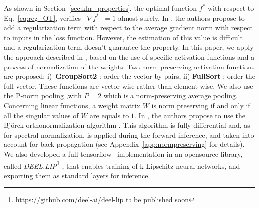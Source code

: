 \documentclass{article}
\newcommand{\Deellip}{
\textit{DEEL.LIP}\footnote{https://github.com/deel-ai/deel-lip to be published soon}
}
\begin{document}
As shown in Section~\ref{sec:khr_properties}, the optimal function $f^*$ with respect to Eq.~\eqref{eq:reg_OT}, verifies $||\nabla f^* ||=1$ almost surely.
In \cite{gulrajani2017improved}, the authors propose to add a regularization term with respect to the average gradient norm with respect to inputs in the loss function. However, the estimation of this value is difficult and a regularization term doesn't guarantee the property. In this paper, we apply the approach described in \cite{pmlr-v97-anil19a}, based on the use of specific activation functions and a process of normalization  of the weights. Two norm preserving activation functions are proposed: i)\ \textbf{GroupSort2} : order the vector by pairs, ii) \textbf{FullSort} : order the full vector.
These functions are vector-wise rather than element-wise. We also use the P-norm pooling \cite{boureau2010},with $P=2$ which is a norm-preserving average pooling.
Concerning linear functions, a weight matrix $W$ is norm preserving if and only if all the singular values of $W$ are equals to $1$. In \cite{pmlr-v97-anil19a}, the authors propose to use the Björck orthonormalization algorithm \cite{bjorck71Ortho}. This algorithm is fully differential and, as for spectral normalization, is applied during the forward inference, and taken into account for back-propagation (see Appendix~\ref{app:normpreserving} for details). We also developed a full tensorflow~\cite{tensorflow2015-whitepaper} implementation in an opensource library, called \Deellip, that enables training of k-Lipschitz neural networks, and exporting them as standard layers for inference. 








\end{document}
